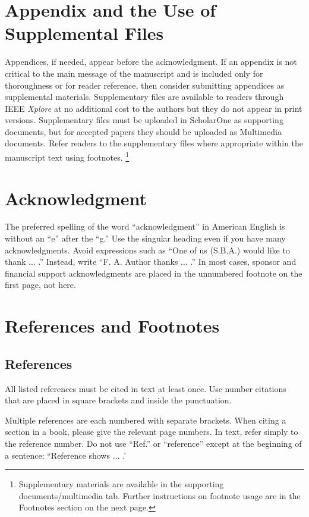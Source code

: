 \documentclass[journal,twoside,web]{ieeecolor}
\begin{document}
\section*{Appendix and the Use of Supplemental Files}
Appendices, if needed, appear before the acknowledgment. If an appendix is not
critical to the main message of the manuscript and is included only for thoroughness
or for reader reference, then consider submitting appendices as supplemental materials.
Supplementary files are available to readers through IEEE \emph{Xplore\textregistered}
at no additional cost to the authors but they do not appear in print versions.
Supplementary files must be uploaded in ScholarOne as supporting documents, but for
accepted papers they should be uploaded as Multimedia documents. Refer readers
to the supplementary files where appropriate within the manuscript text using footnotes.
\footnote{Supplementary materials are available in the supporting documents/multimedia tab.
Further instructions on footnote usage are in the Footnotes section on the next page.}

\section*{Acknowledgment}
The preferred spelling of the word ``acknowledgment'' in American English is 
without an ``e'' after the ``g.'' Use the singular heading even if you have 
many acknowledgments. Avoid expressions such as ``One of us (S.B.A.) would 
like to thank $\ldots$ .'' Instead, write ``F. A. Author thanks $\ldots$ .'' In most 
cases, sponsor and financial support acknowledgments are placed in the 
unnumbered footnote on the first page, not here.

\section*{References and Footnotes}

\subsection{References}
All listed references must be cited in text at least once. Use number citations
that are placed in square brackets and inside the punctuation.

Multiple references are each numbered with separate brackets.
When citing a section in a book, please give the relevant page numbers.
In text, refer simply to the reference number. Do not use ``Ref.'' or
``reference'' except at the beginning of a sentence:
``Reference \cite{b3} shows $\ldots$ .'
\end{document}
